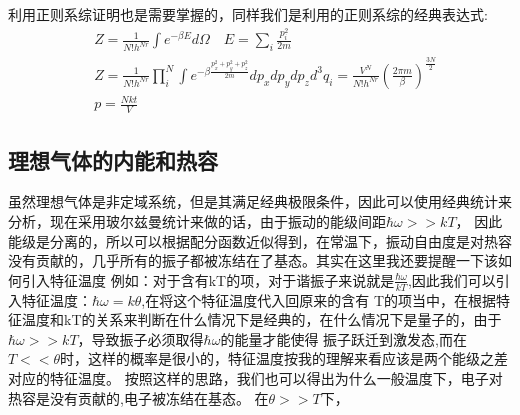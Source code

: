 \documentclass[UTF8]{ctexart}
\begin{document}
利用正则系综证明也是需要掌握的，同样我们是利用的正则系综的经典表达式:
\begin{align*}
         & Z=\frac{1}{N!h^{Nr}}\int e^{-\beta E} d\Omega \quad E=\sum_i \frac{p_i^2}{2m}                                                                          \\
         & Z=\frac{1}{N! h^{Nr}} \prod_i^N \int e^{-\beta \frac{p_x^2+p_y^2+p_z^2}{2m}}dp_xdp_ydp_zd^3q_i=\frac{V^N}{N!h^{Nr}}(\frac{2\pi m}{\beta})^\frac{3N}{2} \\
         & p=\frac{Nkt}{V}
\end{align*}

\subsection{理想气体的内能和热容}
虽然理想气体是非定域系统，但是其满足经典极限条件，因此可以使用经典统计来分析，现在采用玻尔兹曼统计来做的话，由于振动的能级间距$\hbar \omega >> kT$，
因此能级是分离的，所以可以根据配分函数近似得到，在常温下，振动自由度是对热容没有贡献的，几乎所有的振子都被冻结在了基态。其实在这里我还要提醒一下该如何引入特征温度
例如：对于含有kT的项，对于谐振子来说就是$\frac{\hbar \omega}{kT}$,因此我们可以引入特征温度：$\hbar \omega = k\theta$,在将这个特征温度代入回原来的含有
T的项当中，在根据特征温度和kT的关系来判断在什么情况下是经典的，在什么情况下是量子的，由于$\hbar \omega >> kT$，导致振子必须取得$\hbar\omega$的能量才能使得
振子跃迁到激发态,而在$T<<\theta$时，这样的概率是很小的，特征温度按我的理解来看应该是两个能级之差对应的特征温度。
按照这样的思路，我们也可以得出为什么一般温度下，电子对热容是没有贡献的,电子被冻结在基态。
在$\theta >> T$下，
\end{document}
